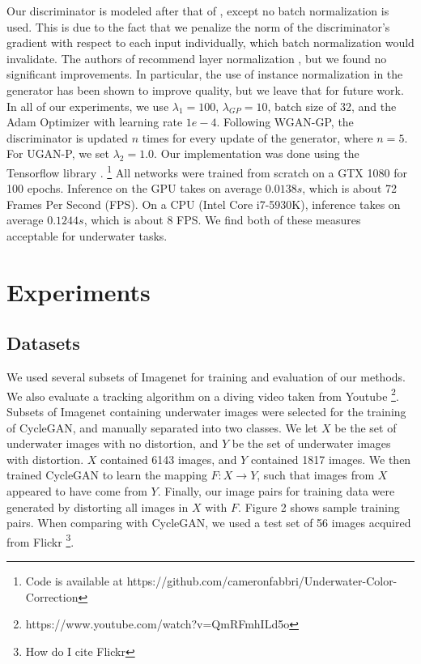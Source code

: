\documentclass[letterpaper, 10pt, conference]{ieeeconf}
\begin{document}
Our discriminator is modeled after that of \cite{radford2015unsupervised}, except no batch normalization is used. This
is due to the fact that we penalize the norm of the discriminator's gradient with respect to each input individually,
which batch normalization would invalidate. The authors of \cite{gulrajani2017improved} recommend layer normalization
\cite{ba2016layer}, but we found no significant improvements. In particular, the use of instance normalization
\cite{ulyanov2016instance} in the generator has been shown to improve quality, but we leave that for future work.
In all of our experiments, we use $\lambda_{1} = 100$, $\lambda_{GP} = 10$, batch size of 32, and the Adam Optimizer
\cite{kingma2014adam} with learning rate $1e-4$. Following WGAN-GP, the discriminator is updated $n$ times for every
update of the generator, where $n = 5$. For UGAN-P, we set $\lambda_{2} = 1.0$. Our implementation was done using the
Tensorflow library \cite{abadi2016tensorflow}.
\footnote{Code is available at https://github.com/cameronfabbri/Underwater-Color-Correction}
All networks were trained from scratch on a GTX 1080 for 100 epochs. Inference on the GPU takes on average $ 0.0138s$,
which is about 72 Frames Per Second (FPS). On a CPU (Intel Core i7-5930K), inference takes on average $ 0.1244s$, which
is about 8 FPS. We find both of these measures acceptable for underwater tasks.

\section{Experiments}
\subsection{Datasets}
We used several subsets of Imagenet \cite{deng2009imagenet} for training and evaluation of our methods. We also
evaluate a tracking algorithm on a diving video taken from Youtube
\footnote{https://www.youtube.com/watch?v=QmRFmhILd5o}. Subsets of Imagenet containing underwater images
were selected for the training of CycleGAN, and manually separated into two classes. We let $X$ be the set of
underwater images with no distortion, and $Y$ be the set of underwater images with distortion. $X$ contained 6143
images, and $Y$ contained 1817 images. We then trained CycleGAN to learn the mapping $F: X \rightarrow Y$, such that
images from $X$ appeared to have come from $Y$. Finally, our image pairs for training data were generated by distorting
all images in $X$ with $F$. Figure 2 shows sample training pairs. When comparing with CycleGAN, we used a test set
of 56 images acquired from Flickr \footnote{How do I cite Flickr}.
\end{document}
